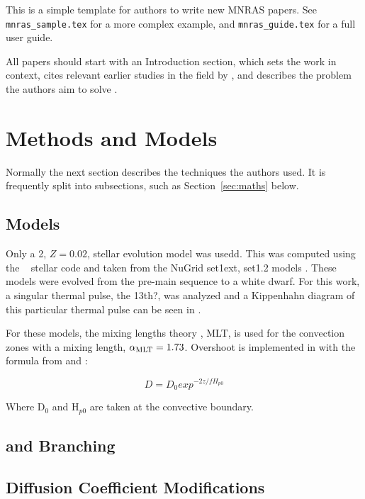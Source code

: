 \documentclass[fleqn,usenatbib]{mnras}
\begin{document}
This is a simple template for authors to write new MNRAS papers.
See \texttt{mnras\_sample.tex} for a more complex example, and \texttt{mnras\_guide.tex}
for a full user guide.

All papers should start with an Introduction section, which sets the work
in context, cites relevant earlier studies in the field by \citet{1996ApJ...456..902R},
and describes the problem the authors aim to solve \citep[e.g.][]{cyburt:10}.

\section{Methods and Models}

Normally the next section describes the techniques the authors used.
It is frequently split into subsections, such as Section~\ref{sec:maths} below.

\subsection{\MESA Models}
\label{sec:mesa_models} %

Only a 2\Msun, $Z=0.02$, stellar evolution model was usedd. This was computed using the \MESA~\citep{mesa} stellar code and taken from the \nugrid NuGrid set1ext, set1.2 models \citep{models}. These models were evolved from the pre-main sequence to a white dwarf. For this work, a singular thermal pulse, the 13th?, was analyzed and a Kippenhahn diagram of this particular thermal pulse can be seen in . 

For these models, the mixing lengths theory \citep{cox}, MLT, is used for the convection zones with a mixing length, $\alpha_{\mathrm{MLT}}=1.73$. Overshoot is implemented in \MESA with the formula from \citet{overshoot} and \citet{freytag}:

\begin{equation}
D = D_{0} exp^{-2z/f H_{p0}}
\label{eq:overshoot}
\end{equation} 

Where D$_{0}$ and H$_{p0}$ are taken at the convective boundary. 


\subsection{\zirconium[95] and \iodine[128] Branching}
\label{sec:branching}


\subsection{Diffusion Coefficient Modifications}
\label{sec:diffusion}
\end{document}
